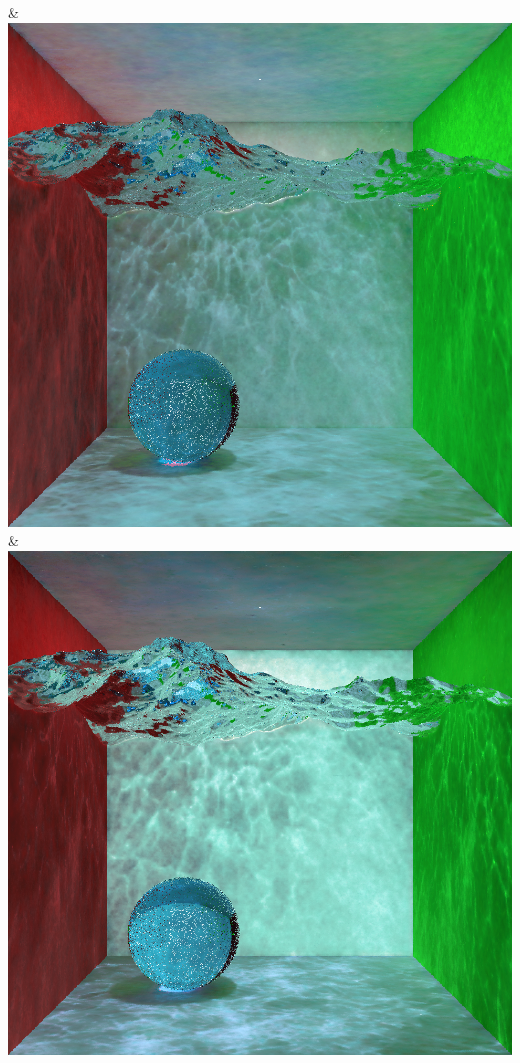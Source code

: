 & \includegraphics[width=\linewidth]{figures/py/tests/quality_comparison/nrc+naive_1spp_caustics_small.png}
& \includegraphics[width=\linewidth]{figures/py/tests/quality_comparison/nrc+naive+bal_1spp_caustics_small.png}
